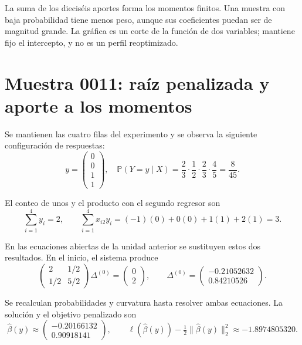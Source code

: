 \documentclass[11pt,a4paper]{article}
\newcommand{\Prob}{\mathbb P}
\begin{document}
La suma de los dieciséis aportes forma los momentos finitos.
Una muestra con baja probabilidad tiene menos peso,
aunque sus coeficientes puedan ser de magnitud grande.
La gráfica es un corte de la función de dos variables;
mantiene fijo el intercepto, y no es un perfil reoptimizado.
\endgroup

\clearpage
\section{Muestra 0011: raíz penalizada y aporte a los momentos}\label{logit128}
\begingroup\small
\setlength{\abovedisplayskip}{4pt}\setlength{\belowdisplayskip}{4pt}
Se mantienen las cuatro filas del experimento y se observa
la siguiente configuración de respuestas:
\[
y=\begin{pmatrix}0\\0\\1\\1\end{pmatrix},\quad \Prob(Y=y\mid X)=\frac{2}{3}\cdot\frac{1}{2}\cdot\frac{2}{3}\cdot\frac{4}{5}=\frac{8}{45}.
\]

El conteo de unos y el producto con el segundo regresor son
\[
\sum_{i=1}^4 y_i=2,\qquad\sum_{i=1}^4x_{i2}y_i=(-1)(0)+0(0)+1(1)+2(1)=3.
\]

En las ecuaciones abiertas de la unidad anterior se sustituyen
estos dos resultados. En el inicio, el sistema produce
\[
\begin{pmatrix}2&1/2\\1/2&5/2\end{pmatrix}\Delta^{(0)}=\begin{pmatrix}0\\2\end{pmatrix},\qquad\Delta^{(0)}=\begin{pmatrix}-0.21052632\\0.84210526\end{pmatrix}.
\]

Se recalculan probabilidades y curvatura hasta resolver
ambas ecuaciones. La solución y el objetivo penalizado son
\[
\widehat\beta(y)\approx\begin{pmatrix}-0.20166132\\0.90918141\end{pmatrix},\qquad \ell(\widehat\beta(y))-\tfrac12\|\widehat\beta(y)\|_2^2\approx-1.8974805320.
\]
\end{document}
